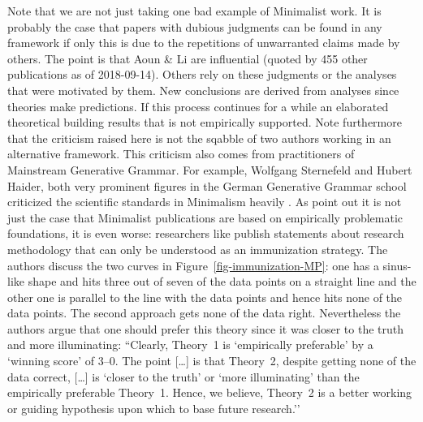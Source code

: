 \documentclass[output=paper]{langsci/langscibook}
\begin{document}
Note that we are not just taking one bad example of Minimalist work. It is probably the case that
papers with dubious judgments can be found in any framework if only this is due to the repetitions
of unwarranted claims made by others. The point is that Aoun \& Li are influential (quoted by 455
other publications as of 2018-09-14). Others rely on these judgments or the analyses that were
motivated by them. New conclusions are derived from analyses since theories make predictions. If
this process continues for a while an elaborated theoretical building results that is not
empirically supported. Note furthermore that the criticism raised here is not the sqabble of two
authors working in an alternative framework. This criticism also comes from practitioners of
Mainstream Generative Grammar. For example, Wolfgang Sternefeld and Hubert Haider, both very
prominent figures in the German Generative Grammar school criticized the scientific standards in
Minimalism heavily \citep{%
SR2012a,Haider2018a}. As \citet[--268]{SR2012a} point out it is not
just the case that Minimalist publications are based on empirically problematic foundations, it is
even worse: researchers like \citet[Section~1.1]{ES2006a-u} publish statements about research
methodology that can only be understood as an immunization strategy. The authors discuss the two
curves in Figure~\ref{fig-immunization-MP}:
one has a sinus-like shape and hits three out of seven of the data points on a straight line and the
other one is parallel to the line with the data points and hence hits none of the data points. The
second approach gets none of the data right. Nevertheless the authors argue that one should prefer
this theory since it was closer to the truth and more illuminating: ``Clearly, Theory~1 is
`empirically preferable’ by a `winning score’ of 3--0. The point [\ldots] is that Theory~2, despite
getting none of the data correct, [\ldots] is `closer to the truth’ or `more illuminating’ than the
empirically preferable Theory~1. Hence, we believe, Theory~2 is a better working or guiding
hypothesis upon which to base future research.'' \citep[]{ES2006a-u}
\end{document}
